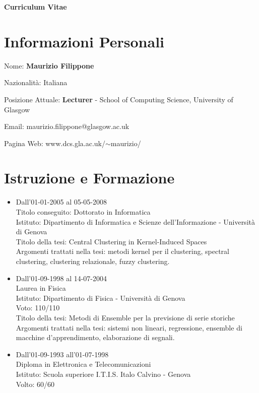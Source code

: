 \documentclass[a4paper,10pt]{article}
\begin{document}
\begin{center}
{\bf \huge Curriculum Vitae}
\end{center}

\section*{Informazioni Personali}
\begin{description}
\item Nome:               {\bf Maurizio Filippone}
\item Nazionalit\`a:        Italiana
\item Posizione Attuale:
  {\bf Lecturer} - School of Computing Science, University of Glasgow
\item Email:              maurizio.filippone@glasgow.ac.uk
\item Pagina Web:         www.dcs.gla.ac.uk/$\sim$maurizio/
\end{description}

\section*{Istruzione e Formazione}
\begin{itemize}
\item Dall'01-01-2005 al 05-05-2008 \\
Titolo conseguito: Dottorato in Informatica \\
Istituto: Dipartimento di Informatica e Scienze dell'Informazione - Universit\`a di Genova \\
Titolo della tesi: Central Clustering in Kernel-Induced Spaces \\
Argomenti trattati nella tesi: metodi kernel per il clustering, spectral clustering, clustering relazionale, fuzzy clustering.

\item Dall'01-09-1998 al 14-07-2004  \\
Laurea in Fisica  \\
Istituto: Dipartimento di Fisica - Universit\`a di Genova \\
Voto: 110/110  \\
Titolo della tesi: Metodi di Ensemble per la previsione di serie storiche \\
Argomenti trattati nella tesi: sistemi non lineari, regressione, ensemble di macchine d'apprendimento, elaborazione di segnali.

\item Dall'01-09-1993 all'01-07-1998  \\
Diploma in Elettronica e Telecomunicazioni \\
Istituto: Scuola superiore I.T.I.S. Italo Calvino - Genova \\
Volto: 60/60

\end{itemize}
\end{document}
